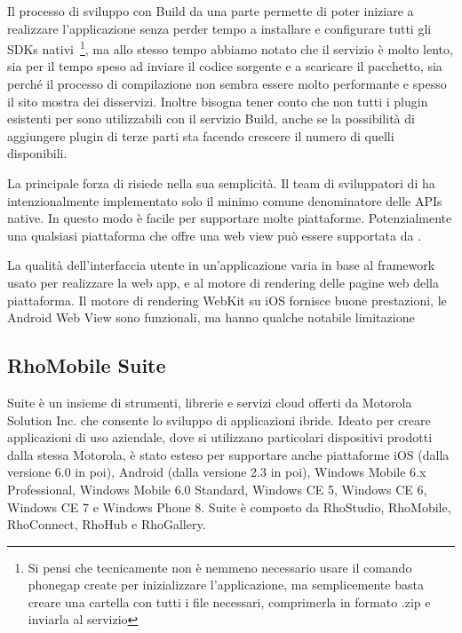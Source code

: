             Il processo di sviluppo con \pg{} Build da una parte permette di
            poter iniziare a realizzare l'applicazione senza perder tempo a
            installare e configurare tutti gli SDKs nativi~\footnote{Si pensi
            che tecnicamente non è nemmeno necessario usare il comando
            phonegap create per inizializzare l'applicazione, ma semplicemente
            basta creare una cartella con tutti i file necessari, comprimerla
            in formato .zip e inviarla al servizio}, ma allo stesso tempo
            abbiamo notato che il servizio è molto lento, sia per il tempo speso
            ad inviare il codice sorgente e a scaricare il pacchetto, sia perché
            il processo di compilazione non sembra essere molto performante e
            spesso il sito mostra
            dei disservizi. Inoltre bisogna tener conto che non tutti i plugin
            esistenti per \pg{} sono utilizzabili con il servizio
            \pg{} Build, anche se la possibilità di aggiungere plugin di terze
            parti sta facendo crescere il numero di quelli disponibili.

            La principale forza di \pg{} risiede nella sua semplicità.
            Il team di sviluppatori di \pg{} ha intenzionalmente implementato
            solo il minimo comune denominatore delle APIs native. In questo modo
            è facile per \pg{} supportare molte piattaforme. Potenzialmente
            una qualsiasi piattaforma che offre una web view può essere supportata
            da \pg{}.

            La qualità dell'interfaccia utente in un'applicazione \pg{}
            varia in base al frame\-work usato per realizzare la web app, e al
            motore di rendering delle pagine web della piattaforma.
            Il motore di rendering WebKit su iOS fornisce buone prestazioni, le
            Android Web View sono funzionali, ma hanno qualche notabile
            limitazione~\citep{Web:KevinSite}


        \subsection{RhoMobile Suite}
            \rhom{} Suite è un insieme di strumenti, librerie e servizi cloud
            offerti da Motorola Solution Inc. che consente lo sviluppo di
            applicazioni ibride. Ideato per creare applicazioni di uso aziendale,
            dove si utilizzano particolari dispositivi prodotti dalla stessa
            Motorola, è stato esteso per supportare anche piattaforme iOS
            (dalla versione 6.0 in poi), Android (dalla versione 2.3 in poi),
            Windows Mobile 6.x Professional, Windows Mobile 6.0 Standard,
            Windows CE 5, Windows CE 6, Windows CE 7 e Windows Phone 8.
            \rhom{} Suite è composto da RhoStudio, RhoMobile, RhoConnect,
            RhoHub e RhoGallery.
